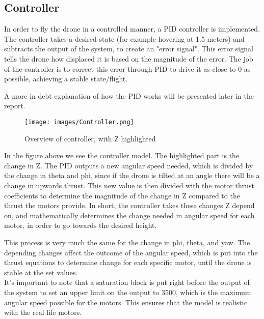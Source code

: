 \subsection{Controller}\label{linear}
In order to fly the drone in a controlled manner, a PID controller is implemented.
The controller takes a desired state (for example hovering at 1.5 meters) and subtracts the output of the system, to create an "error signal".
This error signal tells the drone how displaced it is based on the magnitude of the error. The job of the controller is to correct this error through PID to drive it as close to 0 as possible, achieving a stable state/flight.

A more in debt explanation of how the PID works will be presented later in the report. 

\begin{figure}[H]
\begin{center}
   \texttt{[image: images/Controller.png]}
\end{center}
\caption{Overview of controller, with Z highlighted}
\end{figure}

In the figure above we see the controller model. The highlighted part is the change in Z. The PID outputs a new angular speed needed, which is divided by the change in theta and phi, since if the drone is tilted at an angle there will be a change in upwards thrust. This new value is then divided with the motor thrust coefficients to determine the magnitude of the change in Z compared to the thrust the motors provide. In short, the controller takes these changes Z depend on, and mathematically determines the change needed in angular speed for each motor, in order to go towards the desired height. \cite{Ferry}

This process is very much the same for the change in phi, theta, and yaw. The depending changes affect the outcome of the angular speed, which is put into the thrust equations to determine change for each specific motor, until the drone is stable at the set values.\\

It's important to note that a saturation block is put right before the output of the system to set an upper limit on the output to 3500, which is the maximum angular speed possible for the motors. This ensures that the model is realistic with the real life motors.